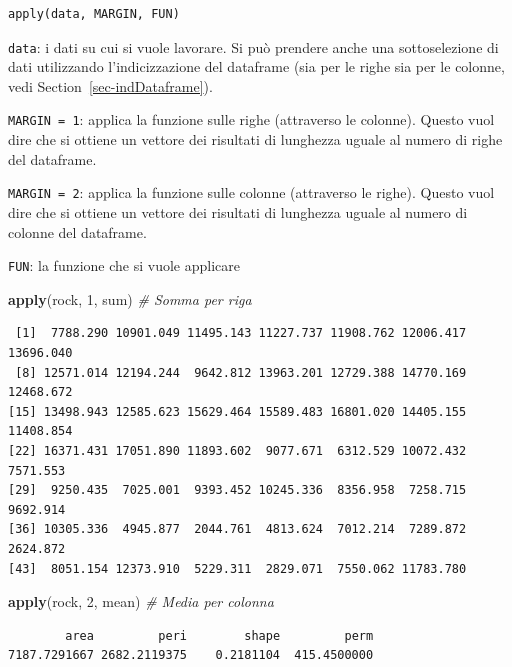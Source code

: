 \documentclass[
  a4paper,
  DIV=11,
  numbers=noendperiod]{scrreprt}
\newenvironment{Shaded}{\begin{snugshade}}{\end{snugshade}}
\newcommand{\CommentTok}[1]{\textcolor[rgb]{0.56,0.35,0.01}{\textit{#1}}}
\newcommand{\DecValTok}[1]{\textcolor[rgb]{0.00,0.00,0.81}{#1}}
\newcommand{\FunctionTok}[1]{\textcolor[rgb]{0.13,0.29,0.53}{\textbf{#1}}}
\newcommand{\NormalTok}[1]{#1}
\begin{document}
\begin{verbatim}
apply(data, MARGIN, FUN)
\end{verbatim}

\texttt{data}: i dati su cui si vuole lavorare. Si può prendere anche
una sottoselezione di dati utilizzando l'indicizzazione del dataframe
(sia per le righe sia per le colonne, vedi
Section~\ref{sec-indDataframe}).

\texttt{MARGIN\ =\ 1}: applica la funzione sulle righe (attraverso le
colonne). Questo vuol dire che si ottiene un vettore dei risultati di
lunghezza uguale al numero di righe del dataframe.

\texttt{MARGIN\ =\ 2}: applica la funzione sulle colonne (attraverso le
righe). Questo vuol dire che si ottiene un vettore dei risultati di
lunghezza uguale al numero di colonne del dataframe.

\texttt{FUN}: la funzione che si vuole applicare

\begin{Shaded}
\begin{Highlighting}[]
\FunctionTok{apply}\NormalTok{(rock, }\DecValTok{1}\NormalTok{, sum)   }\CommentTok{\# Somma per riga }
\end{Highlighting}
\end{Shaded}

\begin{verbatim}
 [1]  7788.290 10901.049 11495.143 11227.737 11908.762 12006.417 13696.040
 [8] 12571.014 12194.244  9642.812 13963.201 12729.388 14770.169 12468.672
[15] 13498.943 12585.623 15629.464 15589.483 16801.020 14405.155 11408.854
[22] 16371.431 17051.890 11893.602  9077.671  6312.529 10072.432  7571.553
[29]  9250.435  7025.001  9393.452 10245.336  8356.958  7258.715  9692.914
[36] 10305.336  4945.877  2044.761  4813.624  7012.214  7289.872  2624.872
[43]  8051.154 12373.910  5229.311  2829.071  7550.062 11783.780
\end{verbatim}

\begin{Shaded}
\begin{Highlighting}[]
\FunctionTok{apply}\NormalTok{(rock, }\DecValTok{2}\NormalTok{, mean)  }\CommentTok{\# Media per colonna }
\end{Highlighting}
\end{Shaded}

\begin{verbatim}
        area         peri        shape         perm 
7187.7291667 2682.2119375    0.2181104  415.4500000 
\end{verbatim}
\end{document}

